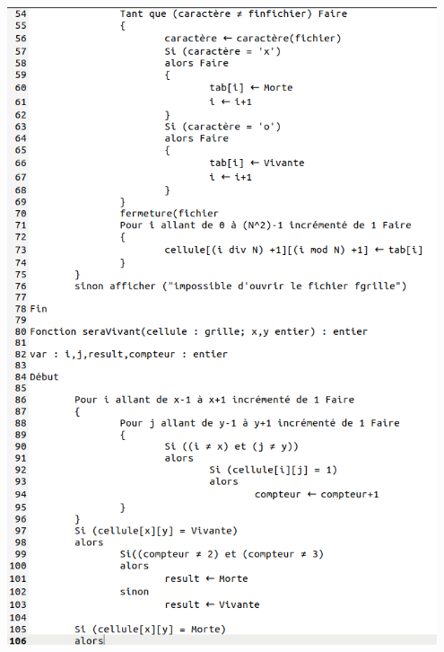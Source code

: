 \documentclass[12,french]{report}
\begin{document}
\begin{center}
	\includegraphics[width=0.95\textwidth]{./Images/Pseudo_code_2'}\\
	

\end{center}
\end{document}
